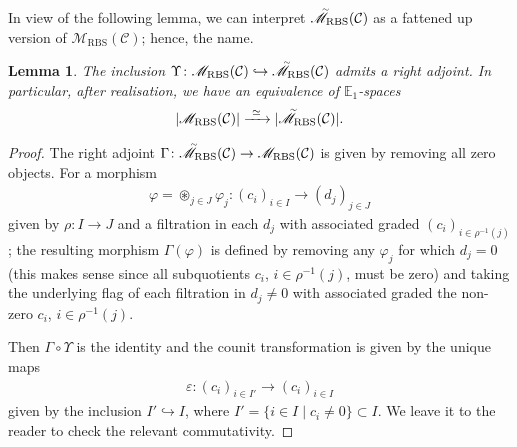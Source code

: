 \documentclass[12pt, reqno]{amsart}
\theoremstyle{plain}
\newtheorem{lemma}[theorem]{Lemma}
\theoremstyle{definition}
\renewcommand{\epsilon}{\varepsilon}
\renewcommand{\phi}{\varphi}
\begin{document}
In view of the following lemma, we can interpret $\accentset{\sim}{\mathscr{M}}_{\operatorname{RBS}}(\mathcal{C})$ as a fattened up version of $\mathscr{M}_{\operatorname{RBS}}(\mathcal{C})$; hence, the name.

\begin{lemma}\label{fluffed up model of monoidal category of flags and associated gradeds}
The inclusion $\Upsilon\colon  \mathscr{M}_{\operatorname{RBS}}(\mathcal{C}) \hookrightarrow \accentset{\sim}{\mathscr{M}}_{\operatorname{RBS}}(\mathcal{C})$ admits a right adjoint. In particular, after realisation, we have an equivalence of $\mathbb{E}_1$-spaces
\begin{align*}
|\mathscr{M}_{\operatorname{RBS}}(\mathcal{C})| \xrightarrow{\ \simeq \ } |\accentset{\sim}{\mathscr{M}}_{\operatorname{RBS}}(\mathcal{C})|.
\end{align*}
\end{lemma}
\begin{proof}
The right adjoint $\Gamma\colon \accentset{\sim}{\mathscr{M}}_{\operatorname{RBS}}(\mathcal{C})\rightarrow \mathscr{M}_{\operatorname{RBS}}(\mathcal{C})$ is given by removing all zero objects. For a morphism
\begin{align*}
\phi=\mathop{\circledast}_{j\in J}\phi_j\colon (c_i)_{i\in I}\rightarrow (d_j)_{j\in J}
\end{align*}
given by $\rho\colon I\rightarrow J$ and a filtration in each $d_j$ with associated graded $(c_i)_{i\in \rho^{-1}(j)}$; the resulting morphism $\Gamma(\phi)$ is defined by removing any $\phi_j$ for which $d_j=0$ (this makes sense since all subquotients $c_i$, $i\in \rho^{-1}(j)$, must be zero) and taking the underlying flag of each filtration in $d_j\neq 0$ with associated graded the non-zero $c_i$, $i\in \rho^{-1}(j)$.

Then $\Gamma\circ \Upsilon$ is the identity and the counit transformation is given by the unique maps
\begin{align*}
\epsilon \colon (c_i)_{i\in I'}\rightarrow (c_i)_{i\in I}
\end{align*}
given by the inclusion $I'\hookrightarrow I$, where $I'=\{i\in I\mid c_i\neq 0\}\subset I$. We leave it to the reader to check the relevant commutativity.
\end{proof}
\end{document}
